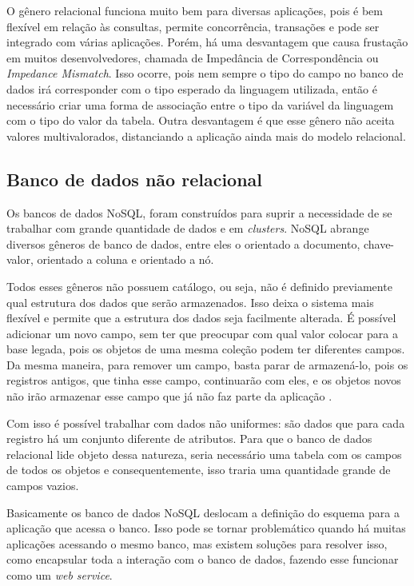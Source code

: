 O gênero relacional funciona muito bem para diversas aplicações, pois é bem flexível em relação às consultas, permite concorrência, transações e pode ser integrado com várias aplicações. Porém, há uma desvantagem que causa frustação em muitos desenvolvedores, chamada de Impedância de Correspondência ou \textit{Impedance Mismatch}. Isso ocorre, pois nem sempre o tipo do campo no banco de dados irá corresponder com o tipo esperado da linguagem utilizada, então é necessário criar uma forma de associação entre o tipo da variável da linguagem com o tipo do valor da tabela. Outra desvantagem é que esse gênero não aceita valores multivalorados, distanciando a aplicação ainda mais do modelo relacional.


\subsection{Banco de dados não relacional}
\label{subsec:nosqldatabasetype}
Os bancos de dados NoSQL, foram construídos para suprir a necessidade de se trabalhar com grande quantidade de dados e em \textit{clusters}. NoSQL abrange diversos gêneros de banco de dados, entre eles o orientado a documento, chave-valor, orientado a coluna e orientado a nó.

Todos esses gêneros não possuem catálogo, ou seja, não é definido previamente qual estrutura dos dados que serão armazenados. Isso deixa o sistema mais flexível e permite que a estrutura dos dados seja facilmente alterada. É possível adicionar um novo campo, sem ter que preocupar com qual valor colocar para a base legada, pois os objetos de uma mesma coleção podem ter diferentes campos. Da mesma maneira, para remover um campo, basta parar de armazená-lo, pois os registros antigos, que tinha esse campo, continuarão com eles, e os objetos novos não irão armazenar esse campo que já não faz parte da aplicação \cite{NoSQL}.

Com isso é possível trabalhar com dados não uniformes: são dados que para cada registro há um conjunto diferente de atributos. Para que o banco de dados relacional lide objeto dessa natureza, seria necessário uma tabela com os campos de todos os objetos e consequentemente, isso traria uma quantidade grande de campos vazios.

Basicamente os banco de dados NoSQL deslocam a definição do esquema para a aplicação que acessa o banco. Isso pode se tornar problemático quando há muitas aplicações acessando o mesmo banco, mas existem soluções para resolver isso, como encapsular toda a interação com o banco de dados, fazendo esse funcionar como um \textit{web service}.


